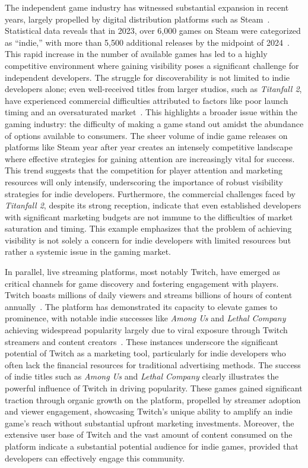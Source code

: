 \documentclass[conference]{IEEEtran}
\begin{document}
The independent game industry has witnessed substantial expansion in recent years, largely propelled by digital distribution platforms such as Steam~\cite{steam}. Statistical data reveals that in 2023, over 6,000 games on Steam were categorized as ``indie,'' with more than 5,500 additional releases by the midpoint of 2024~\cite{steam_indie_releases}. This rapid increase in the number of available games has led to a highly competitive environment where gaining visibility poses a significant challenge for independent developers. The struggle for discoverability is not limited to indie developers alone; even well-received titles from larger studios, such as \textit{Titanfall 2}, have experienced commercial difficulties attributed to factors like poor launch timing and an oversaturated market~\cite{titanfall2_sales}. This highlights a broader issue within the gaming industry: the difficulty of making a game stand out amidst the abundance of options available to consumers. The sheer volume of indie game releases on platforms like Steam year after year creates an intensely competitive landscape where effective strategies for gaining attention are increasingly vital for success. This trend suggests that the competition for player attention and marketing resources will only intensify, underscoring the importance of robust visibility strategies for indie developers. Furthermore, the commercial challenges faced by \textit{Titanfall 2}, despite its strong reception, indicate that even established developers with significant marketing budgets are not immune to the difficulties of market saturation and timing. This example emphasizes that the problem of achieving visibility is not solely a concern for indie developers with limited resources but rather a systemic issue in the gaming market.

In parallel, live streaming platforms, most notably Twitch, have emerged as critical channels for game discovery and fostering engagement with players. Twitch boasts millions of daily viewers and streams billions of hours of content annually~\cite{twitch_stats}. The platform has demonstrated its capacity to elevate games to prominence, with notable indie successes like \textit{Among Us} and \textit{Lethal Company} achieving widespread popularity largely due to viral exposure through Twitch streamers and content creators~\cite{twitch_game_creator_success}. These instances underscore the significant potential of Twitch as a marketing tool, particularly for indie developers who often lack the financial resources for traditional advertising methods. The success of indie titles such as \textit{Among Us} and \textit{Lethal Company} clearly illustrates the powerful influence of Twitch in driving popularity. These games gained significant traction through organic growth on the platform, propelled by streamer adoption and viewer engagement, showcasing Twitch's unique ability to amplify an indie game's reach without substantial upfront marketing investments. Moreover, the extensive user base of Twitch and the vast amount of content consumed on the platform indicate a substantial potential audience for indie games, provided that developers can effectively engage this community.
\end{document}

